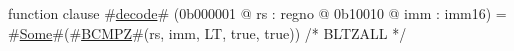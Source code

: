 function clause #\hyperref[zdecode]{decode}# (0b000001 @ rs : regno @ 0b10010 @ imm : imm16) =
  #\hyperref[zSome]{Some}#(#\hyperref[zBCMPZ]{BCMPZ}#(rs, imm, LT, true, true))   /* BLTZALL */
